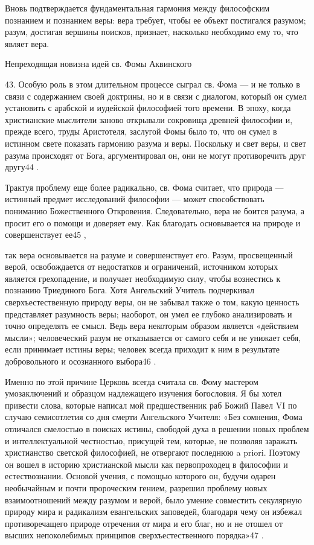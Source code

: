 \documentclass[a5paper,10pt]{article}
\begin{document}
Вновь подтверждается фундаментальная гармония между философским познанием и
познанием веры: вера требует, чтобы ее объект постигался разумом; разум,
достигая вершины поисков, признает, насколько необходимо ему то, что являет
вера.

Непреходящая новизна идей св. Фомы Аквинского

43. Особую роль в этом длительном процессе сыграл св. Фома — и не только в
связи с содержанием своей доктрины, но и в связи с диалогом, который он сумел
установить с арабской и иудейской философией того времени. В эпоху, когда
христианские мыслители заново открывали сокровища древней философии и, прежде
всего, труды Аристотеля, заслугой Фомы было то, что он сумел в истинном свете
показать гармонию разума и веры. Поскольку и свет веры, и свет разума
происходят от Бога, аргументировал он, они не могут противоречить друг другу44
.

Трактуя проблему еще более радикально, св. Фома считает, что природа — истинный
предмет исследований философии — может способствовать пониманию Божественного
Откровения. Следовательно, вера не боится разума, а просит его о помощи и
доверяет ему. Как благодать основывается на природе и совершенствует ее45 ,

так вера основывается на разуме и совершенствует его. Разум, просвещенный
верой, освобождается от недостатков и ограничений, источником которых является
грехопадение, и получает необходимую силу, чтобы вознестись к познанию
Триединого Бога. Хотя Ангельский Учитель подчеркивал сверхъестественную природу
веры, он не забывал также о том, какую ценность представляет разумность веры;
наоборот, он умел ее глубоко анализировать и точно определять ее смысл. Ведь
вера некоторым образом является «действием мысли»; человеческий разум не
отказывается от самого себя и не унижает себя, если принимает истины веры;
человек всегда приходит к ним в результате добровольного и осознанного выбора46
.

Именно по этой причине Церковь всегда считала св. Фому мастером умозаключений и
образцом надлежащего изучения богословия. Я бы хотел привести слова, которые
написал мой предшественник раб Божий Павел VI по случаю семисотлетия со дня
смерти Ангельского Учителя: «Без сомнения, Фома отличался смелостью в поисках
истины, свободой духа в решении новых проблем и интеллектуальной честностью,
присущей тем, которые, не позволяя заражать христианство светской философией,
не отвергают последнюю a priori. Поэтому он вошел в историю христианской мысли
как первопроходец в философии и естествознании. Основой учения, с помощью
которого он, будучи одарен необычайным и почти пророческим гением, разрешил
проблему новых взаимоотношений между разумом и верой, было умение совместить
секулярную природу мира и радикализм евангельских заповедей, благодаря чему он
избежал противоречащего природе отречения от мира и его благ, но и не отошел от
высших непоколебимых принципов сверхъестественного порядка»47 .
\end{document}
